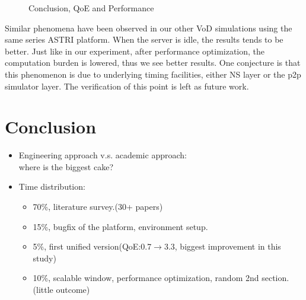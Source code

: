 \documentclass[11pt,a4paper]{article}
\begin{document}
\begin{figure}[htb]
\centering
	\caption{Conclusion, QoE and Performance}
	\label{fig:simu_con_detail}
\end{figure}

Similar phenomena have been observed in our other VoD simulations using 
the same series ASTRI platform\cite{huang2010simulation}. When the server 
is idle, the results tends to be better. Just like in our experiment, after 
performance optimization, the computation burden is lowered, thus we see 
better results. One conjecture is that this phenomenon is due to underlying 
timing facilities, either NS\cite{ns,pdns} layer or the p2p simulator 
layer\cite{huang2010simulation}. The verification of this point is
left as future work. 


\section{Conclusion}

	\begin{itemize}
		\item Engineering approach v.s. academic approach:\\
		where is the biggest cake? 
		\item Time distribution:
			\begin{itemize}
				\item 70\%, literature survey.(30+ papers) 
				\item 15\%, bugfix of the platform, environment setup. 
				\item 5\%, first unified version(QoE:0.7$\rightarrow$3.3, 
				biggest improvement in this study)
				\item 10\%, scalable window, performance optimization, random 
				2nd section. (little outcome)
			\end{itemize}
	\end{itemize}
\end{document}

